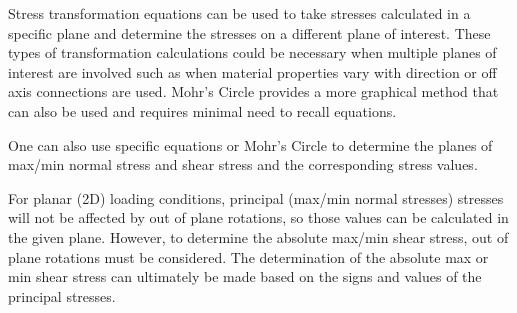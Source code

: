 \documentclass[
  letterpaper,
  DIV=11,
  numbers=noendperiod]{scrreprt}
\begin{document}
\begin{tcolorbox}[enhanced jigsaw, breakable, opacityback=0, toptitle=1mm, left=2mm, colback=white, opacitybacktitle=0.6, colframe=quarto-callout-note-color-frame, titlerule=0mm, arc=.35mm, leftrule=.75mm, bottomtitle=1mm, colbacktitle=quarto-callout-note-color!10!white, rightrule=.15mm, title={Key takeaways}, bottomrule=.15mm, toprule=.15mm, coltitle=black]

Stress transformation equations can be used to take stresses calculated
in a specific plane and determine the stresses on a different plane of
interest. These types of transformation calculations could be necessary
when multiple planes of interest are involved such as when material
properties vary with direction or off axis connections are used. Mohr's
Circle provides a more graphical method that can also be used and
requires minimal need to recall equations.

One can also use specific equations or Mohr's Circle to determine the
planes of max/min normal stress and shear stress and the corresponding
stress values.

For planar (2D) loading conditions, principal (max/min normal stresses)
stresses will not be affected by out of plane rotations, so those values
can be calculated in the given plane. However, to determine the absolute
max/min shear stress, out of plane rotations must be considered. The
determination of the absolute max or min shear stress can ultimately be
made based on the signs and values of the principal stresses.

\end{tcolorbox}
\end{document}
